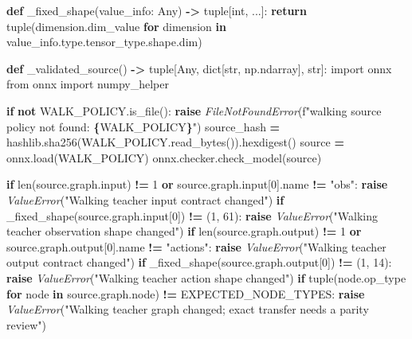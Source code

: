\documentclass[
  chinese,
  11pt,
  letterpaper,
]{article}
\newenvironment{Shaded}{\begin{snugshade}}{\end{snugshade}}
\newcommand{\BuiltInTok}[1]{#1}
\newcommand{\ControlFlowTok}[1]{\textcolor[rgb]{0.13,0.29,0.53}{\textbf{#1}}}
\newcommand{\DecValTok}[1]{\textcolor[rgb]{0.00,0.00,0.81}{#1}}
\newcommand{\ImportTok}[1]{#1}
\newcommand{\KeywordTok}[1]{\textcolor[rgb]{0.13,0.29,0.53}{\textbf{#1}}}
\newcommand{\NormalTok}[1]{#1}
\newcommand{\OperatorTok}[1]{\textcolor[rgb]{0.81,0.36,0.00}{\textbf{#1}}}
\newcommand{\PreprocessorTok}[1]{\textcolor[rgb]{0.56,0.35,0.01}{\textit{#1}}}
\newcommand{\SpecialCharTok}[1]{\textcolor[rgb]{0.81,0.36,0.00}{\textbf{#1}}}
\newcommand{\SpecialStringTok}[1]{\textcolor[rgb]{0.31,0.60,0.02}{#1}}
\newcommand{\StringTok}[1]{\textcolor[rgb]{0.31,0.60,0.02}{#1}}
\renewenvironment{Shaded}{\par\smallskip}{\par\smallskip}
\begin{document}
\begin{Shaded}
\begin{Highlighting}[]
\KeywordTok{def}\NormalTok{ \_fixed\_shape(value\_info: Any) }\OperatorTok{{-}\textgreater{}} \BuiltInTok{tuple}\NormalTok{[}\BuiltInTok{int}\NormalTok{, ...]:}
    \ControlFlowTok{return} \BuiltInTok{tuple}\NormalTok{(dimension.dim\_value }\ControlFlowTok{for}\NormalTok{ dimension }\KeywordTok{in}\NormalTok{ value\_info.}\BuiltInTok{type}\NormalTok{.tensor\_type.shape.dim)}


\KeywordTok{def}\NormalTok{ \_validated\_source() }\OperatorTok{{-}\textgreater{}} \BuiltInTok{tuple}\NormalTok{[Any, }\BuiltInTok{dict}\NormalTok{[}\BuiltInTok{str}\NormalTok{, np.ndarray], }\BuiltInTok{str}\NormalTok{]:}
    \ImportTok{import}\NormalTok{ onnx}
    \ImportTok{from}\NormalTok{ onnx }\ImportTok{import}\NormalTok{ numpy\_helper}

    \ControlFlowTok{if} \KeywordTok{not}\NormalTok{ WALK\_POLICY.is\_file():}
        \ControlFlowTok{raise} \PreprocessorTok{FileNotFoundError}\NormalTok{(}\SpecialStringTok{f"walking source policy not found: }\SpecialCharTok{\{}\NormalTok{WALK\_POLICY}\SpecialCharTok{\}}\SpecialStringTok{"}\NormalTok{)}
\NormalTok{    source\_hash }\OperatorTok{=}\NormalTok{ hashlib.sha256(WALK\_POLICY.read\_bytes()).hexdigest()}
\NormalTok{    source }\OperatorTok{=}\NormalTok{ onnx.load(WALK\_POLICY)}
\NormalTok{    onnx.checker.check\_model(source)}

    \ControlFlowTok{if} \BuiltInTok{len}\NormalTok{(source.graph.}\BuiltInTok{input}\NormalTok{) }\OperatorTok{!=} \DecValTok{1} \KeywordTok{or}\NormalTok{ source.graph.}\BuiltInTok{input}\NormalTok{[}\DecValTok{0}\NormalTok{].name }\OperatorTok{!=} \StringTok{"obs"}\NormalTok{:}
        \ControlFlowTok{raise} \PreprocessorTok{ValueError}\NormalTok{(}\StringTok{"Walking teacher input contract changed"}\NormalTok{)}
    \ControlFlowTok{if}\NormalTok{ \_fixed\_shape(source.graph.}\BuiltInTok{input}\NormalTok{[}\DecValTok{0}\NormalTok{]) }\OperatorTok{!=}\NormalTok{ (}\DecValTok{1}\NormalTok{, }\DecValTok{61}\NormalTok{):}
        \ControlFlowTok{raise} \PreprocessorTok{ValueError}\NormalTok{(}\StringTok{"Walking teacher observation shape changed"}\NormalTok{)}
    \ControlFlowTok{if} \BuiltInTok{len}\NormalTok{(source.graph.output) }\OperatorTok{!=} \DecValTok{1} \KeywordTok{or}\NormalTok{ source.graph.output[}\DecValTok{0}\NormalTok{].name }\OperatorTok{!=} \StringTok{"actions"}\NormalTok{:}
        \ControlFlowTok{raise} \PreprocessorTok{ValueError}\NormalTok{(}\StringTok{"Walking teacher output contract changed"}\NormalTok{)}
    \ControlFlowTok{if}\NormalTok{ \_fixed\_shape(source.graph.output[}\DecValTok{0}\NormalTok{]) }\OperatorTok{!=}\NormalTok{ (}\DecValTok{1}\NormalTok{, }\DecValTok{14}\NormalTok{):}
        \ControlFlowTok{raise} \PreprocessorTok{ValueError}\NormalTok{(}\StringTok{"Walking teacher action shape changed"}\NormalTok{)}
    \ControlFlowTok{if} \BuiltInTok{tuple}\NormalTok{(node.op\_type }\ControlFlowTok{for}\NormalTok{ node }\KeywordTok{in}\NormalTok{ source.graph.node) }\OperatorTok{!=}\NormalTok{ EXPECTED\_NODE\_TYPES:}
        \ControlFlowTok{raise} \PreprocessorTok{ValueError}\NormalTok{(}\StringTok{"Walking teacher graph changed; exact transfer needs a parity review"}\NormalTok{)}


\end{Highlighting}
\end{Shaded}
\end{document}
